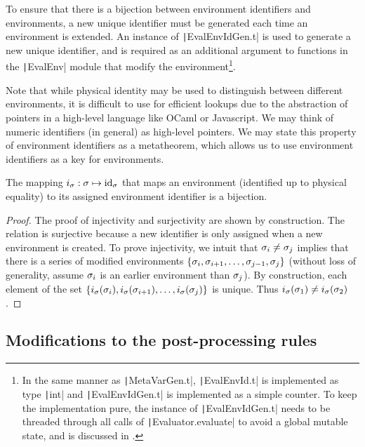 To ensure that there is a bijection between environment identifiers and environments, a new unique identifier must be generated each time an environment is extended. An instance of \texttt|EvalEnvIdGen.t| is used to generate a new unique identifier, and is required as an additional argument to functions in the \texttt|EvalEnv| module that modify the environment\footnote{
  In the same manner as \texttt|MetaVarGen.t|, \texttt|EvalEnvId.t| is implemented as type \texttt|int| and \texttt|EvalEnvIdGen.t| is implemented as a simple counter. To keep the implementation pure, the instance of \texttt|EvalEnvIdGen.t| needs to be threaded through all calls of \texttt|Evaluator.evaluate| to avoid a global mutable state, and is discussed in .
}.

Note that while physical identity may be used to distinguish between different environments, it is difficult to use for efficient lookups due to the abstraction of pointers in a high-level language like OCaml or Javascript. We may think of numeric identifiers (in general) as high-level pointers. We may state this property of environment identifiers as a metatheorem, which allows us to use environment identifiers as a key for environments.

\begin{theorem}
  The mapping $i_\sigma:\sigma\mapsto\text{id}_\sigma$ that maps an environment (identified up to physical equality) to its assigned environment identifier is a bijection.
\end{theorem}

\begin{proof}
  The proof of injectivity and surjectivity are shown by construction. The relation is surjective because a new identifier is only assigned when a new environment is created. To prove injectivity, we intuit that $\sigma_i\ne\sigma_j$ implies that there is a series of modified environments $\{\sigma_i,\sigma_{i+1},\dots,\sigma_{j-1},\sigma_j\}$ (without loss of generality, assume $\sigma_i$ is an earlier environment than $\sigma_j$). By construction, each element of the set $\{i_\sigma(\sigma_i),i_\sigma(\sigma_{i+1}),\dots,i_\sigma(\sigma_j)\}$ is unique. Thus $i_\sigma(\sigma_1)\ne i_\sigma(\sigma_2)$.
\end{proof}

\subsection{Modifications to the post-processing rules}
\label{sec:memoization-postprocessing}

